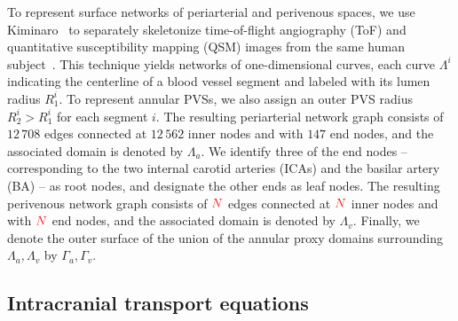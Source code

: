 \documentclass[fleqn,10pt]{wlscirep}
\newcommand{\fixme}[1]{\textcolor{red}{#1}}
\begin{document}
To represent surface networks of periarterial and perivenous spaces,
we use Kiminaro~\cite{william_silversmith_2021_5539913} to separately
skeletonize time-of-flight angiography (ToF) and quantitative
susceptibility mapping (QSM) images from the same human
subject~\cite{hodneland2019new}. This technique yields networks of
one-dimensional curves, each curve $\Lambda^i$ indicating the
centerline of a blood vessel segment and labeled with its lumen radius
$R_1^i$. To represent annular PVSs, we also assign an outer PVS radius
$R_2^i > R_1^i$ for each segment $i$. The resulting periarterial
network graph consists of $12\,708$ edges connected at $12\,562$ inner
nodes and with $147$ end nodes, and the associated domain is denoted
by $\Lambda_a$. We identify three of the end nodes -- corresponding to
the two internal carotid arteries (ICAs) and the basilar artery (BA)
-- as root nodes, and designate the other ends as leaf nodes. The
resulting perivenous network graph consists of $\fixme{N}$ edges
connected at $\fixme{N}$ inner nodes and with $\fixme{N}$ end nodes,
and the associated domain is denoted by $\Lambda_v$. Finally, we
denote the outer surface of the union of the annular proxy domains
surrounding $\Lambda_a, \Lambda_v$ by $\Gamma_a, \Gamma_v$.


\subsection*{Intracranial transport equations}
\end{document}
